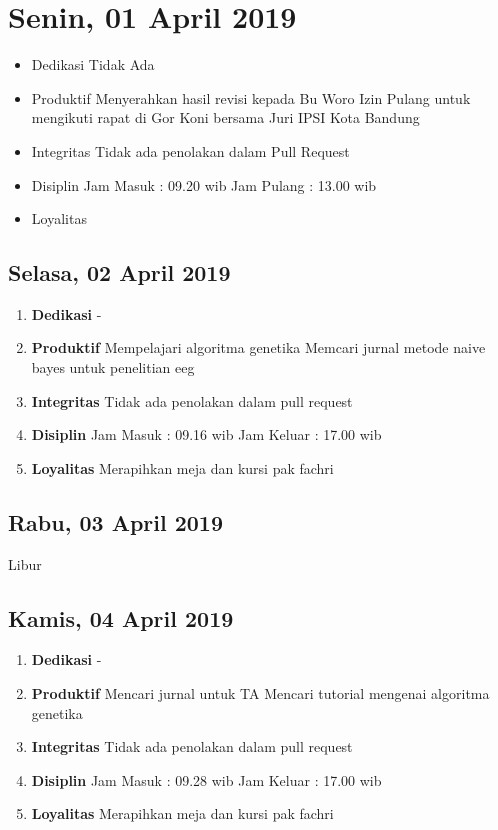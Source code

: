 \section{Senin, 01 April 2019}
\begin{itemize}
\item Dedikasi
\subitem Tidak Ada
\item Produktif
  \subitem Menyerahkan hasil revisi kepada Bu Woro
  \subitem Izin Pulang untuk mengikuti rapat di Gor Koni bersama Juri IPSI Kota Bandung
\item Integritas
  \subitem Tidak ada penolakan dalam Pull Request
\item Disiplin
  \subitem Jam Masuk : 09.20 wib
  \subitem Jam Pulang : 13.00 wib
\item Loyalitas
  \subitem 
\end{itemize}

\subsection{Selasa, 02 April 2019}
\begin{enumerate}
\item \textbf{Dedikasi}
\subitem -
\item \textbf{Produktif}
\subitem Mempelajari algoritma genetika
\subitem Memcari jurnal metode naive bayes untuk penelitian eeg
\item \textbf{Integritas}
\subitem Tidak ada penolakan dalam pull request
\item \textbf{Disiplin}
\subitem Jam Masuk : 09.16 wib
\subitem Jam Keluar : 17.00 wib
\item \textbf{Loyalitas}
\subitem Merapihkan meja dan kursi pak fachri
\end{enumerate}

\subsection{Rabu, 03 April 2019}
Libur

\subsection{Kamis, 04 April 2019}
\begin{enumerate}
\item \textbf{Dedikasi}
\subitem -
\item \textbf{Produktif}
\subitem Mencari jurnal untuk TA
\subitem Mencari tutorial mengenai algoritma genetika
\item \textbf{Integritas}
\subitem Tidak ada penolakan dalam pull request
\item \textbf{Disiplin}
\subitem Jam Masuk : 09.28 wib
\subitem Jam Keluar : 17.00 wib
\item \textbf{Loyalitas}
\subitem Merapihkan meja dan kursi pak fachri
\end{enumerate}

